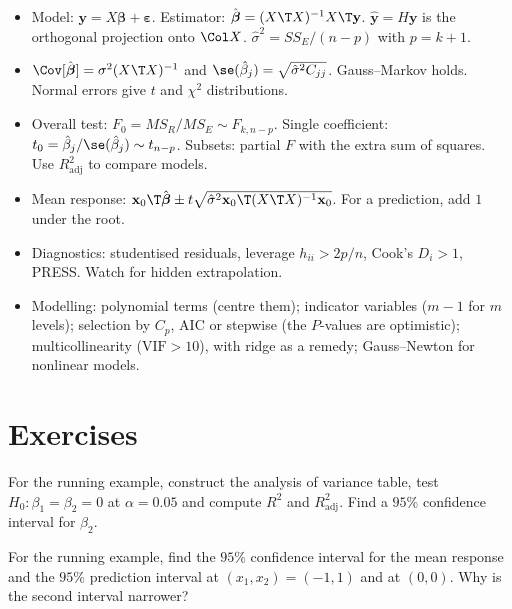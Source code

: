\begin{summarybox}
\begin{itemize}
  \item Model: $\mathbf{y}=X\boldsymbol\beta+\boldsymbol\varepsilon$. Estimator: $\hat{\boldsymbol\beta}=(X\T X)^{-1}X\T\mathbf{y}$. $\hat{\mathbf{y}}=H\mathbf{y}$ is the orthogonal projection onto $\Col X$. $\hat\sigma^2=SS_E/(n-p)$ with $p=k+1$.
  \item $\Cov[\hat{\boldsymbol\beta}]=\sigma^2(X\T X)^{-1}$ and $\se(\hat\beta_j)=\sqrt{\hat\sigma^2C_{jj}}$. Gauss--Markov holds. Normal errors give $t$ and $\chi^2$ distributions.
  \item Overall test: $F_0=MS_R/MS_E\sim F_{k,n-p}$. Single coefficient: $t_0=\hat\beta_j/\se(\hat\beta_j)\sim t_{n-p}$. Subsets: partial $F$ with the extra sum of squares. Use $R^2_{\mathrm{adj}}$ to compare models.
  \item Mean response: $\mathbf{x}_0\T\hat{\boldsymbol\beta}\pm t\sqrt{\hat\sigma^2\mathbf{x}_0\T(X\T X)^{-1}\mathbf{x}_0}$. For a prediction, add $1$ under the root.
  \item Diagnostics: studentised residuals, leverage $h_{ii}>2p/n$, Cook's $D_i>1$, PRESS. Watch for hidden extrapolation.
  \item Modelling: polynomial terms (centre them); indicator variables ($m-1$ for $m$ levels); selection by $C_p$, AIC or stepwise (the $P$-values are optimistic); multicollinearity ($\mathrm{VIF}>10$), with ridge as a remedy; Gauss--Newton for nonlinear models.
\end{itemize}
\end{summarybox}

\section{Exercises}

\begin{exercise}
For the running example, construct the analysis of variance table, test $H_0:\beta_1=\beta_2=0$ at $\alpha=0.05$ and compute $R^2$ and $R^2_{\mathrm{adj}}$. Find a $95\%$ confidence interval for $\beta_2$.
\end{exercise}

\begin{exercise}
For the running example, find the $95\%$ confidence interval for the mean response and the $95\%$ prediction interval at $(x_1,x_2)=(-1,1)$ and at $(0,0)$. Why is the second interval narrower?
\end{exercise}

